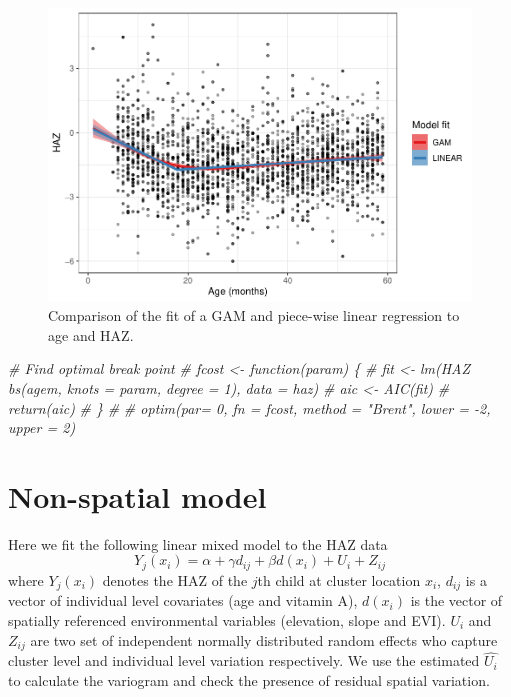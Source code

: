 \documentclass[11pt,]{article}
\newenvironment{Shaded}{\begin{snugshade}}{\end{snugshade}}
\newcommand{\CommentTok}[1]{\textcolor[rgb]{0.56,0.35,0.01}{\textit{#1}}}
\begin{document}
\begin{figure}[H]

{\centering \includegraphics{skeleton_files/figure-latex/agevshaz-1} 

}

\caption{Comparison of the fit of a GAM and piece-wise linear regression to age and HAZ.}\label{fig:agevshaz}
\end{figure}

\begin{Shaded}
\begin{Highlighting}[]
\CommentTok{# Find optimal break point}
\CommentTok{# fcost <- function(param) \{}
\CommentTok{#   fit <- lm(HAZ ~ bs(agem, knots = param, degree = 1), data = haz)}
\CommentTok{#   aic <- AIC(fit)}
\CommentTok{#   return(aic)}
\CommentTok{# \}}
\CommentTok{# }
\CommentTok{# optim(par= 0, fn = fcost, method = "Brent", lower = -2, upper = 2)}
\end{Highlighting}
\end{Shaded}

\hypertarget{non-spatial-model}{%
\section{Non-spatial model}\label{non-spatial-model}}

Here we fit the following linear mixed model to the HAZ data
\begin{equation}
Y_j(x_i)=\alpha+\gamma d_{ij} + \beta d(x_i) + U_{i} + Z_{ij}
\end{equation} where \(Y_j(x_i)\) denotes the HAZ of the \(j\)th child
at cluster location \(x_i\), \(d_{ij}\) is a vector of individual level
covariates (age and vitamin A), \(d(x_i)\) is the vector of spatially
referenced environmental variables (elevation, slope and EVI). \(U_{i}\)
and \(Z_{ij}\) are two set of independent normally distributed random
effects who capture cluster level and individual level variation
respectively. We use the estimated \(\hat{U_i}\) to calculate the
variogram and check the presence of residual spatial variation.
\end{document}
